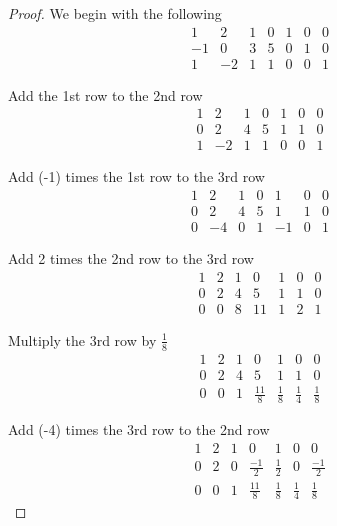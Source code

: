 \begin{proof}
    We begin with the following
    \[
        \begin{array}{cccc|ccc}
            1  & 2  & 1 & 0 & 1 & 0 & 0 \\
            -1 & 0  & 3 & 5 & 0 & 1 & 0 \\
            1  & -2 & 1 & 1 & 0 & 0 & 1
        \end{array}
    \]

    Add the 1st row to the 2nd row
    \[
        \begin{array}{cccc|ccc}
            1 & 2  & 1 & 0 & 1 & 0 & 0 \\
            0 & 2  & 4 & 5 & 1 & 1 & 0 \\
            1 & -2 & 1 & 1 & 0 & 0 & 1
        \end{array}
    \]

    Add (-1) times the 1st row to the 3rd row
    \[
        \begin{array}{cccc|ccc}
            1 & 2  & 1 & 0 & 1  & 0 & 0 \\
            0 & 2  & 4 & 5 & 1  & 1 & 0 \\
            0 & -4 & 0 & 1 & -1 & 0 & 1
        \end{array}
    \]

    Add 2 times the 2nd row to the 3rd row
    \[
        \begin{array}{cccc|ccc}
            1 & 2 & 1 & 0  & 1 & 0 & 0 \\
            0 & 2 & 4 & 5  & 1 & 1 & 0 \\
            0 & 0 & 8 & 11 & 1 & 2 & 1
        \end{array}
    \]

    Multiply the 3rd row by $\frac{1}{8}$
    \[
        \begin{array}{cccc|ccc}
            1 & 2 & 1 & 0            & 1           & 0           & 0           \\
            0 & 2 & 4 & 5            & 1           & 1           & 0           \\
            0 & 0 & 1 & \frac{11}{8} & \frac{1}{8} & \frac{1}{4} & \frac{1}{8}
        \end{array}
    \]

    Add (-4) times the 3rd row to the 2nd row
    \[
        \begin{array}{cccc|ccc}
            1 & 2 & 1 & 0            & 1           & 0           & 0            \\
            0 & 2 & 0 & \frac{-1}{2} & \frac{1}{2} & 0           & \frac{-1}{2} \\
            0 & 0 & 1 & \frac{11}{8} & \frac{1}{8} & \frac{1}{4} & \frac{1}{8}
        \end{array}
    \]


\end{proof}
